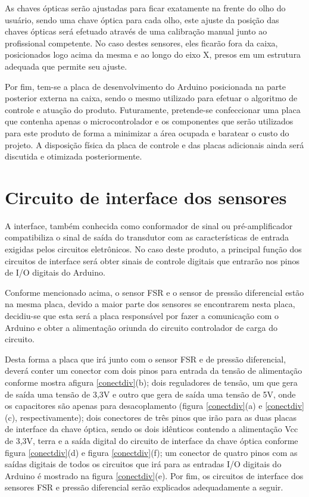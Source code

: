 As chaves ópticas serão ajustadas para ficar exatamente na frente do olho do usuário, sendo uma chave óptica para cada olho, este ajuste da posição das chaves ópticas será efetuado através de uma calibração manual junto ao profissional competente. No caso destes sensores, eles ficarão fora da caixa, posicionados logo acima da mesma e ao longo do eixo X, presos em um estrutura adequada que permite seu ajuste.

Por fim, tem-se a placa de desenvolvimento do Arduino posicionada na parte posterior externa na caixa, sendo o mesmo utilizado para efetuar o algoritmo de controle e atuação do produto. Futuramente, pretende-se confeccionar uma placa que contenha apenas o microcontrolador e os componentes que serão utilizados para este produto de forma a minimizar a área ocupada e baratear o custo do projeto. A disposição física da placa de controle e das placas adicionais ainda será discutida e otimizada posteriormente.

\section[Circuito de interface dos sensores]{Circuito de interface dos sensores}

A interface, também conhecida como conformador de sinal ou pré-amplificador compatibiliza o sinal de saída do transdutor com as características de entrada exigidas pelos circuitos eletrônicos. No caso deste produto, a principal função dos circuitos de interface será obter sinais de controle digitais que entrarão nos pinos de I/O digitais do Arduino.
	
Conforme mencionado acima, o sensor FSR e o sensor de pressão diferencial estão na mesma placa, devido a maior parte dos sensores se encontrarem nesta placa, decidiu-se que esta será a placa responsável por fazer a comunicação com o Arduino e obter a alimentação oriunda do circuito controlador de carga do circuito.

Desta forma a placa que irá junto com o sensor FSR e de pressão diferencial, deverá conter um conector com dois pinos para entrada da tensão de alimentação conforme mostra afigura \ref{conectdiv}(b); dois reguladores de tensão, um que gera de saída uma tensão de 3,3V e outro que gera de saída uma tensão de 5V, onde os capacitores são apenas para desacoplamento (figura \ref{conectdiv}(a) e \ref{conectdiv}(c), respectivamente); dois conectores de três pinos que irão para as duas placas de interface da chave óptica, sendo os dois idênticos contendo a alimentação Vcc de 3,3V, terra e a saída digital do circuito de interface da chave óptica conforme figura \ref{conectdiv}(d) e figura \ref{conectdiv}(f); um conector de quatro pinos com as saídas digitais de todos os circuitos que irá para as entradas I/O digitais do Arduino é mostrado na figura \ref{conectdiv}(e). Por fim, os circuitos de interface dos sensores FSR e pressão diferencial serão explicados adequadamente a seguir.


